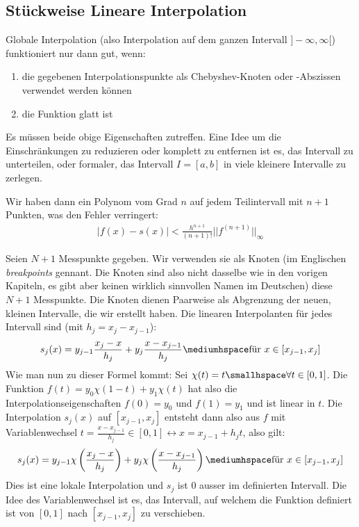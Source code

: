 \subsection{Stückweise Lineare Interpolation}
Globale Interpolation (also Interpolation auf dem ganzen Intervall $]-\infty, \infty[$) funktioniert nur dann gut, wenn:
\rmvspace
\begin{enumerate}[label=(\alph*), noitemsep]
    \item die gegebenen Interpolationspunkte als Chebyshev-Knoten oder -Abszissen verwendet werden können
    \item die Funktion glatt ist
\end{enumerate}
Es müssen beide obige Eigenschaften zutreffen. 
Eine Idee um die Einschränkungen zu reduzieren oder komplett zu entfernen ist es, das Intervall zu unterteilen, oder formaler,
das Intervall $I = [a, b]$ in viele kleinere Intervalle zu zerlegen.

Wir haben dann ein Polynom vom Grad $n$ auf jedem Teilintervall mit $n + 1$ Punkten, was den Fehler verringert:
\begin{align*}
    |f(x) - s(x)| < \frac{h^{n + 1}}{(n + 1)!} ||f^{(n + 1)}||_{\infty}
\end{align*}

Seien $N + 1$ Messpunkte gegeben. Wir verwenden sie als Knoten 
(im Englischen \textit{breakpoints} gennant. Die Knoten sind also nicht dasselbe wie in den vorigen Kapiteln, es gibt aber keinen wirklich sinnvollen Namen im Deutschen)
diese $N + 1$ Messpunkte. Die Knoten dienen Paarweise als Abgrenzung der neuen, kleinen Intervalle, die wir erstellt haben. 
Die linearen Interpolanten für jedes Intervall sind (mit $h_j = x_j - x_{j - 1}$):
\begin{align*}
    s_j(x) = y_{j - 1}\frac{x_j - x}{h_j} + y_j \frac{x - x_{j - 1}}{h_j} \mediumhspace \text{für } x \in [x_{j - 1}, x_j]
\end{align*}
Wie man nun zu dieser Formel kommt:
Sei $\chi(t) = t \smallhspace \forall t \in [0, 1]$. 
Die Funktion $f(t) = y_0 \chi(1 - t) + y_1 \chi(t)$ hat also die Interpolationseigenschaften $f(0) = y_0$ und $f(1) = y_1$ und ist linear in $t$.
Die Interpolation $s_j(x)$ auf $[x_{j - 1}, x_j]$ entsteht dann also aus $f$ mit Variablenwechsel $t = \frac{x - x_{j - 1}}{h_j} \in [0, 1] \leftrightarrow x = x_{j - 1} + h_j t$,
also gilt:
\begin{align*}
    s_j(x) = y_{j - 1} \chi \left( \frac{x_j - x}{h_j} \right) + y_j \chi \left( \frac{x - x_{j - 1}}{h_j} \right) \mediumhspace \text{für } x \in [x_{j - 1}, x_j]
\end{align*}
Dies ist eine lokale Interpolation und $s_j$ ist $0$ ausser im definierten Intervall. 
Die Idee des Variablenwechsel ist es, das Intervall, auf welchem die Funktion definiert ist von $[0, 1]$ nach $[x_{j - 1}, x_j]$ zu verschieben.
